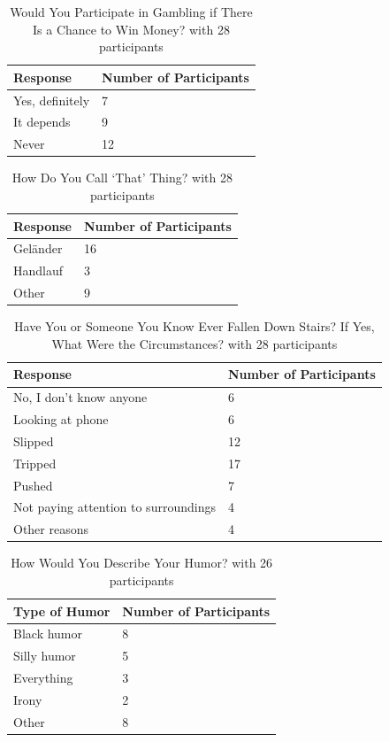\documentclass{article}
\begin{document}
\begin{longtable}[]{@{}ll@{}}
\caption{Would You Participate in Gambling if There Is a Chance to Win Money? with 28 participants} \label{would-you-participate-in-gambling-if-there-is-a-chance-to-win-money} \\
\toprule\noalign{}
Response & Number of Participants \\
\midrule\noalign{}
\endhead
\bottomrule\noalign{}
\endlastfoot
Yes, definitely & 7 \\
It depends & 9 \\
Never & 12 \\
\end{longtable}

\begin{longtable}[]{@{}ll@{}}
\caption{How Do You Call `That' Thing? with 28 participants} \label{how-do-you-call-that-thing} \\
\toprule\noalign{}
Response & Number of Participants \\
\midrule\noalign{}
\endhead
\bottomrule\noalign{}
\endlastfoot
Geländer & 16 \\
Handlauf & 3 \\
Other & 9 \\
\end{longtable}

\begin{longtable}[]{@{}ll@{}}
\caption{Have You or Someone You Know Ever Fallen Down Stairs? If Yes, What Were the Circumstances? with 28 participants} \label{have-you-or-someone-you-know-ever-fallen-down-stairs-if-yes-what-were-the-circumstances} \\
\toprule\noalign{}
Response & Number of Participants \\
\midrule\noalign{}
\endhead
\bottomrule\noalign{}
\endlastfoot
No, I don't know anyone & 6 \\
Looking at phone & 6 \\
Slipped & 12 \\
Tripped & 17 \\
Pushed & 7 \\
Not paying attention to surroundings & 4 \\
Other reasons & 4 \\
\end{longtable}

\begin{longtable}[]{@{}ll@{}}
\caption{How Would You Describe Your Humor? with 26 participants} \label{how-would-you-describe-your-humor} \\
\toprule\noalign{}
Type of Humor & Number of Participants \\
\midrule\noalign{}
\endhead
\bottomrule\noalign{}
\endlastfoot
Black humor & 8 \\
Silly humor & 5 \\
Everything & 3 \\
Irony & 2 \\
Other & 8 \\
\end{longtable}
\end{document}
